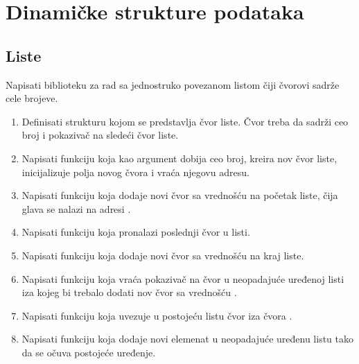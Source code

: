 
\chapter{Dinamičke strukture podataka}

\section{Liste}

\begin{Exercise}[label=601]
Napisati biblioteku za rad sa jednostruko povezanom listom čiji čvorovi sadrže cele brojeve. 
\begin{enumerate}
\item Definisati strukturu  kojom se predstavlja čvor liste. Čvor treba da sadrži ceo broj  i pokazivač na sledeći čvor liste.

\item Napisati funkciju  koja kao argument dobija ceo broj, kreira nov čvor liste, inicijalizuje polja novog čvora i vraća njegovu adresu.

 \item Napisati funkciju  koja dodaje novi čvor sa vrednošću  na početak liste, čija glava se nalazi na adresi .

 \item Napisati funkciju  koja pronalazi poslednji čvor u listi.

 \item Napisati funkciju  koja dodaje novi čvor sa vrednošću  na kraj liste. 

 \item Napisati funkciju  koja vraća pokazivač na čvor u neopadajuće uređenoj listi iza kojeg bi trebalo dodati nov čvor sa vrednošću .

 \item Napisati funkciju  koja uvezuje u postojeću listu čvor  iza čvora .

 \item Napisati funkciju  koja dodaje novi elemenat u neopadajuće uređenu listu tako da se očuva postojeće uređenje.


\end{enumerate}
\end{Exercise}
